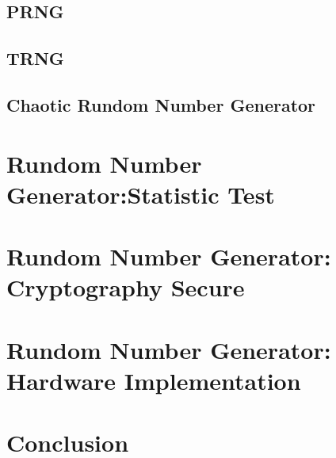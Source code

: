 \documentclass[English, runningheads,a4paper]{llncs}
\begin{document}
\subsection{PRNG}


\subsection{TRNG}


\subsection{Chaotic Rundom Number Generator}


\section{Rundom Number Generator:Statistic Test }


\section{Rundom Number Generator: Cryptography Secure}


\section{Rundom Number Generator: Hardware Implementation}


\section{Conclusion}

\end{document}
